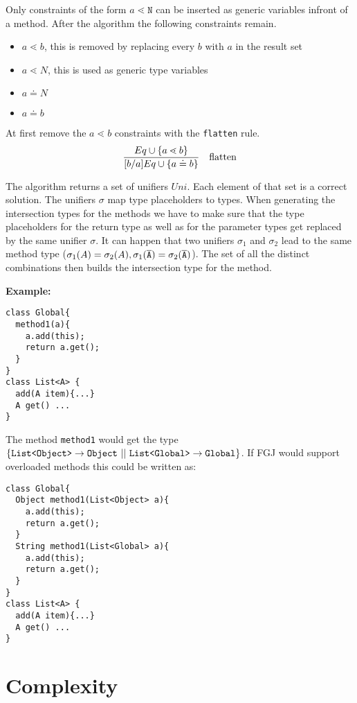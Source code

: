 \documentclass[a4paper,USenglish,cleveref, autoref, thm-restate]{lipics-v2021}
\begin{document}
Only constraints of the form $a \lessdot \texttt{N}$ can be inserted as generic variables infront of a method.
After the \unify{} algorithm the following constraints remain.
\begin{itemize}
  \item $a \lessdot b$, this is removed by replacing every $b$ with $a$ in the result set
  \item $a \lessdot N$, this is used as generic type variables
  \item $a \doteq N$
  \item $a \doteq b$
\end{itemize}

At first remove the $a \lessdot b$ constraints with the \texttt{flatten} rule.
\begin{align*}
  \frac{\displaystyle 
    Eq \cup \{  a \lessdot b \}
  }{\displaystyle 
    [b/a]Eq \cup \{  a \doteq b  \}
  }
  \quad \text{flatten}
\end{align*}


The \unify{} algorithm returns a set of unifiers ${Uni}$.
Each element of that set is a correct solution.
The unifiers $\sigma$ map type placeholders to types.
When generating the intersection types for the methods we have to make sure that the
type placeholders for the return type as well as for the parameter types get replaced by the same unifier $\sigma$.
It can happen that two unifiers $\sigma_1$ and $\sigma_2$ lead to the same method type ($\sigma_1(A) = \sigma_2(A), \sigma_1(\overline{\tt A}) = \sigma_2(\overline{\tt A})$).
The set of all the distinct combinations then builds the intersection type for the method.

\textbf{Example:}
\begin{lstlisting}
class Global{
  method1(a){
    a.add(this);
    return a.get();
  }
}
class List<A> {
  add(A item){...}
  A get() ...
}
\end{lstlisting}

The method \texttt{method1} would get the type $\{  \mathtt{List \texttt{<} Object \texttt{>} } \to \texttt{Object}
\ || \ \mathtt{List \texttt{<} Global \texttt{>} } \to \texttt{Global} \}$.
If FGJ would support overloaded methods this could be written as:
\begin{lstlisting}
class Global{
  Object method1(List<Object> a){
    a.add(this);
    return a.get();
  }
  String method1(List<Global> a){
    a.add(this);
    return a.get();
  }
}
class List<A> {
  add(A item){...}
  A get() ...
}
\end{lstlisting}

\section{Complexity}
\label{sec:complexity}
\end{document}
